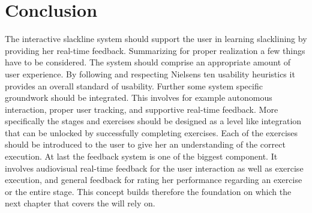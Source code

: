 \section{Conclusion}\label{4_7_conclusion}
The interactive slackline system should support the user in learning slacklining by providing her real-time feedback. Summarizing for proper realization a few things have to be considered. The system should comprise an appropriate amount of user experience. By following and respecting Nielsens ten usability heuristics it provides an overall standard of usability. Further some system specific groundwork should be integrated. This involves for example autonomous interaction, proper user tracking, and supportive real-time feedback. More specifically the stages and exercises should be designed as a level like integration that can be unlocked by successfully completing exercises. Each of the exercises should be introduced to the user to give her an understanding of the correct execution. At last the feedback system is one of the biggest component. It involves audiovisual real-time feedback for the user interaction as well as exercise execution, and general feedback for rating her performance regarding an exercise or the entire stage. This concept builds therefore the foundation on which the next chapter that covers the \textbf{} will rely on.

